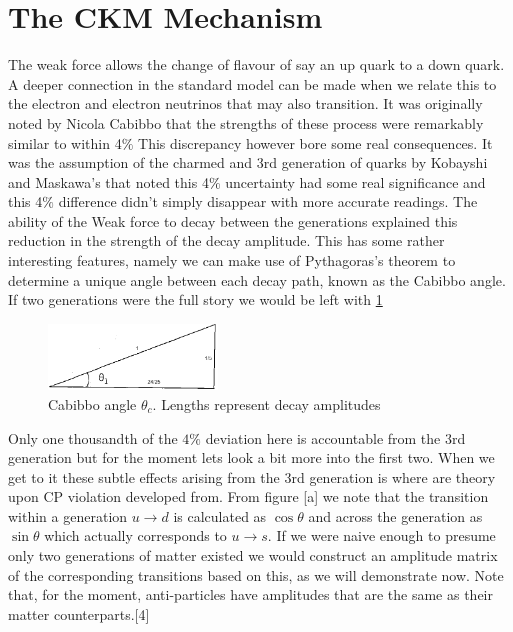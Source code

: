 \documentclass[floatfix,aps,prd,amsmath,amssymb]{revtex4}
\begin{document}
\section*{The CKM Mechanism}

The weak force allows the change of flavour of say an up quark to a down quark. A deeper connection in the standard model can be made when we relate this to the electron and electron neutrinos that may also transition. It was originally noted by Nicola Cabibbo that the strengths of these process were remarkably similar to within 4$\%$ This discrepancy however bore some real consequences. It was the assumption of the charmed and 3rd generation of quarks by Kobayshi and Maskawa’s that noted this 4$\%$ uncertainty had some real significance and this 4$\%$ difference didn't simply disappear with more accurate readings. The ability of the Weak force to decay between the generations explained this reduction in the strength of the decay amplitude. This has some rather interesting features, namely we can make use of Pythagoras's theorem to determine a unique angle between each decay path, known as the Cabibbo angle. If two generations were the full story we would be left with \cref{cabibbo}

\begin{figure}[h]
\centering
\includegraphics[width=0.4\textwidth]{figs/ckmfig1.jpg}
\caption{Cabibbo angle $\theta_c$. Lengths represent decay amplitudes}
\label{cabibbo}
\end{figure}


Only one thousandth of the $4\%$ deviation here is accountable from the 3rd generation but for the moment lets look a bit more into the first two.
When we get to it these subtle effects arising from the 3rd generation is where are theory upon CP violation developed from. From figure [a] we note that the transition within a generation $u\rightarrow d$ is calculated as $\cos\theta$ and across the generation as $\sin\theta$ which actually corresponds to $u\rightarrow s$. If we were naive enough to presume only two generations of matter existed we would construct an amplitude matrix of the corresponding transitions based on this, as we will demonstrate now. Note that, for the moment, anti-particles have amplitudes that are the same as their matter counterparts.[4]
\end{document}
